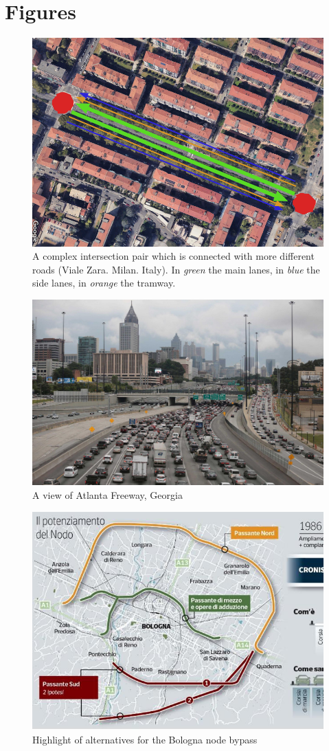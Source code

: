 
\section{Figures}

\begin{figure}[h]
    \centering
    \includegraphics[width=0.75\linewidth]{figures/multigraph-is-better-than-nothing.png}
    \caption{A complex intersection pair which is connected with more different roads (Viale Zara. Milan. Italy). In \textit{green} the main lanes, in \textit{blue} the side lanes, in \textit{orange} the tramway.}
    \label{fig:multigraph-is-better-than-nothing}
\end{figure}

\begin{figure}[h]
    \centering
    \includegraphics[width=0.75\linewidth]{figures/atlanta-georgia-freeway.jpg}
    \caption{A view of Atlanta Freeway, Georgia}
    \label{fig:atlanta-georgia-freeway}
\end{figure}

\begin{figure}[h]
    \centering
    \includegraphics[width=0.75\linewidth]{figures/bologna-bypass.jpg}
    \caption{Highlight of alternatives for the Bologna node bypass}
    \label{fig:bologna-bypass}
\end{figure}
